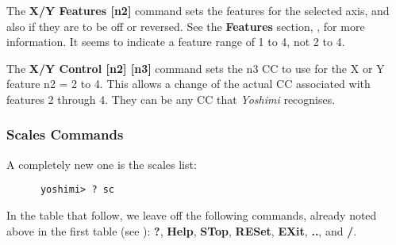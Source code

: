    The \textbf{X/Y Features [n2]} command sets the features for the
   selected axis, and also if they are to be off or reversed.
   See the \textbf{Features} section,
   , for more information.
   It seems to indicate a feature range of 1 to 4, not 2 to 4.

   The \textbf{X/Y Control [n2] [n3]} command
   sets the n3 CC to use for the X or Y feature n2 = 2 to 4.
   This allows a change of the actual CC associated with features 2 through 4.
   They can be any CC that \textsl{Yoshimi} recognises.

\subsubsection{Scales Commands}
\label{subsec:command_line_scales_command_list}

   A completely new one is the scales list:

   \begin{verbatim}
      yoshimi> ? sc
   \end{verbatim}

   In the table that follow, we leave off the following commands, already noted
   above in the first table
   (see ):
   \textbf{?}, \textbf{Help}, \textbf{STop}, \textbf{RESet},
   \textbf{EXit}, \textbf{..}, and \textbf{/}.


